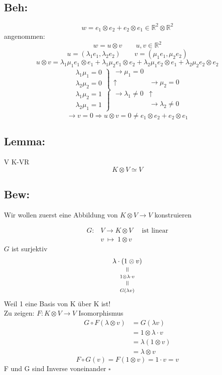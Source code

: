\documentclass[titlepage,12pt,a4paper,ngerman]{report}
\newenvironment{bew}[1]{\subsection{Bew: #1}}{\hfill$\square$}
\newcommand{\Bew}[2]{\begin{bew}{#1}#2\end{bew}}
\newcommand{\verteq}{\rotatebox{90}{$\,=$}}
\newcommand{\equalto}[2]{\underset{\scriptstyle\overset{\mkern4mu\verteq}{#2}}{#1}}
\newcommand{\tx}[1]{\textrm{#1}}
\begin{document}
\subsection{Beh:}
$$w = e_1 \otimes e_2 + e_2 \otimes e_1 \in \mathbb{R}^2 \otimes \mathbb{R}^2$$
angenommen:
$$w = u \otimes v \qquad u,v \in \mathbb{R}^2$$
$$u = (\lambda_1 e_1, \lambda_2 e_2) \qquad v = (\mu_1 e_1, \mu_2 e_2)$$
$$u \otimes v = \lambda_1 \mu_1 e_1 \otimes e_1 + \lambda_1 \mu_2 e_1 \otimes e_2 + \lambda_2 \mu_1 e_2 \otimes e_1 + \lambda_2 \mu_2 e_2 \otimes e_2$$
$$ \left.\begin{array}{c}
\lambda_1 \mu_1 = 0\\
\lambda_2 \mu_2 = 0\\
\lambda_1 \mu_2 = 1\\
\lambda_2 \mu_1 = 1
\end{array} \right\} \begin{array}{cc}
\rightarrow \mu_1 = 0\\
\uparrow & \rightarrow \mu_2 = 0\\
\rightarrow \lambda_1 \neq 0 & \uparrow\\
& \rightarrow \lambda_2 \neq 0\\
\end{array}$$
$$\rightarrow v = 0 \Rightarrow u \otimes v = 0 \neq e_1 \otimes e_2 + e_2 \otimes e_1$$

\subsection{Lemma:}
V K-VR
$$ K \otimes V \simeq V$$

\Bew{}{
Wir wollen zuerst eine Abbildung von $ K \otimes V \to V $ konstruieren


\begin{align*}
G: &V \to K \otimes V \quad \tx{ ist linear}\\
&v \ \mapsto \ 1 \otimes v
\end{align*}
$ G $ ist surjektiv 
$$\equalto{\lambda \cdot (1 \otimes v)}{\equalto{1 \otimes \lambda \cdot v}{G(\lambda v)}}$$
Weil 1 eine Basis von K über K ist!\\
Zu zeigen: $ F : K \otimes V \to V $ Isomorphismus
\begin{align*}
G \circ F(\lambda \otimes v) &= G(\lambda v) \\
&= 1 \otimes \lambda \cdot v\\
&= \lambda(1 \otimes v)\\
&= \lambda \otimes v
\end{align*}
$$F \circ G(v) = F(1 \otimes v) = 1 \cdot v = v$$
F und G sind Inverse voneinander
}
\end{document}
